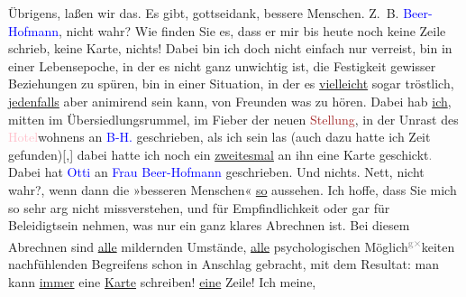 \pstart
           Übrigens, laßen wir das. Es gibt, gottseidank, bessere Menschen. Z. B. \textcolor{blue}{Beer-Hofmann}{}\ledrightnote{\textcolor{blue}{Richard Beer-Hofmann}}, nicht wahr? Wie finden Sie es,
               dass er mir bis heute noch keine Zeile schrieb, keine
               Karte, nichts! Dabei bin ich doch nicht einfach nur verreist, bin in einer
               Lebensepoche, in der es nicht ganz unwichtig ist, die Festigkeit gewisser Beziehungen
               zu spüren, bin in einer Situation, in der es \uline{vielleicht} sogar tröstlich, \uline{jedenfalls} aber
               animirend sein kann, von Freunden was zu hören. Dabei hab \uline{ich}, mitten im Übersiedlungsrummel, im Fieber der neuen \textcolor{brown}{Stellung}{}\ledrightnote{{$\rightarrow$}\textcolor{brown}{B.Z. am Mittag}}, in der Unrast des \textcolor{pink}{Hotel}{}\ledrightnote{{$\rightarrow$}\textcolor{pink}{Hotel Saxonia}}wohnens an \textcolor{blue}{B-H.}{}\ledrightnote{\textcolor{blue}{Richard Beer-Hofmann}} geschrieben, als ich sein \label{K_L03415-7v}\label{K_L03415-7h} las (auch dazu
               hatte ich Zeit gefunden){[},{]} dabei hatte ich noch ein \uline{zweitesmal} an ihn eine Karte
                  geschickt\textcolor{gray}{.} Dabei hat \textcolor{blue}{Otti}{}\ledrightnote{\textcolor{blue}{Ottilie Salten}} an \textcolor{blue}{Frau Beer-Hofmann}{}\ledrightnote{\textcolor{blue}{Paula Beer-Hofmann}}
               geschrieben. Und nichts. Nett, nicht wahr?, wenn dann die »besseren Menschen« \uline{so} aussehen. Ich hoffe, dass Sie mich so sehr arg
               nicht missverstehen, und für Empfindlichkeit oder gar für Beleidigtsein nehmen, was
               nur ein ganz klares Abrechnen ist. Bei diesem Abrechnen sind \uline{alle} mildernden Umstände, \uline{alle}
               psychologischen Möglich\substVorne{}\textsuperscript{\textcolor{gray}{g}\textcolor{gray}{×}}\substDazwischen{}k\substHinten{}eiten nachfühlenden Begreifens schon in Anschlag gebracht, mit dem Resultat:
               man kann \uline{immer} eine \uline{Karte} schreiben! \uline{eine} Zeile! Ich meine,
